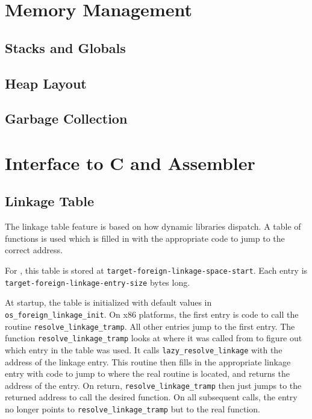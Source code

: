 \chapter{Memory Management}

\section{Stacks and Globals}

\section{Heap Layout}

\section{Garbage Collection}

\chapter{Interface to C and Assembler}


\section{Linkage Table}

The linkage table feature is based on how dynamic libraries dispatch.
A table of functions is used which is filled in with the appropriate
code to jump to the correct address.

For \cmucl{}, this table is stored at
\verb|target-foreign-linkage-space-start|. Each entry is
\verb|target-foreign-linkage-entry-size| bytes long.

At startup, the table is initialized with default values in
\verb|os_foreign_linkage_init|. On x86 platforms, the first entry is
code to call the routine \verb|resolve_linkage_tramp|. All other
entries jump to the first entry. The function
\verb|resolve_linkage_tramp| looks at where it was called from to
figure out which entry in the table was used. It calls
\verb|lazy_resolve_linkage| with the address of the linkage entry.
This routine then fills in the appropriate linkage entry with code to
jump to where the real routine is located, and returns the address of
the entry. On return, \verb|resolve_linkage_tramp| then just jumps to
the returned address to call the desired function. On all subsequent
calls, the entry no longer points to \verb|resolve_linkage_tramp| but
to the real function.

